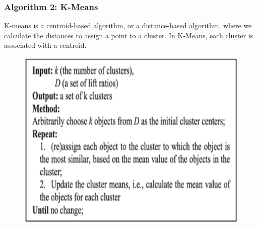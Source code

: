 \subsubsection{Algorithm 2: K-Means }
K-means is a centroid-based algorithm, or a distance-based algorithm, where we calculate the distances to assign a point to a cluster. In K-Means, each cluster is associated with a centroid.
\begin{figure}[!h]
	\centering
	\includegraphics[width = \textwidth]{./algo1}
	
\end{figure}

